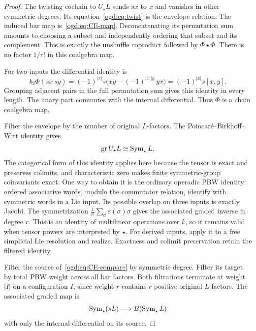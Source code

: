 \begin{proof}
The twisting cochain to \(U_\star L\) sends \(sx\) to \(x\) and vanishes in other symmetric degrees.
Its equation~\eqref{ogd:eq:twist} is the envelope relation.
The induced bar map is~\eqref{ogd:eq:CE-map}.
Deconcatenating its permutation sum amounts to choosing a subset and independently ordering that subset and its complement.
This is exactly the unshuffle coproduct followed by \(\Phi\star\Phi\).
There is no factor \(1/r!\) in this coalgebra map.

For two inputs the differential identity is
\[
 b_2\Phi(sx\,sy)=(-1)^{|x|}
 s\bigl(xy-(-1)^{|x||y|}yx\bigr)=(-1)^{|x|}s[x,y].
\]
Grouping adjacent pairs in the full permutation sum gives this identity in every length.
The unary part commutes with the internal differential.
Thus \(\Phi\) is a chain coalgebra map.

Filter the envelope by the number of original \(L\)-factors.
The Poincar\'e--Birkhoff--Witt identity gives
\begin{equation}\label{ogd:eq:PBW}
 \operatorname{gr}U_\star L\simeq\operatorname{Sym}_\star L.
\end{equation}
The categorical form of this identity applies here because the tensor is exact and preserves colimits, and characteristic zero makes finite symmetric-group coinvariants exact.
One way to obtain it is the ordinary operadic PBW identity: ordered associative words, modulo the commutator relation, identify with symmetric words in a Lie input.
Its possible overlap on three inputs is exactly Jacobi.
The symmetrization \(\frac1{r!}\sum_{\sigma}\varepsilon(\sigma)\sigma\) gives the associated graded inverse in degree \(r\).
This is an identity of multilinear operations over \(k\), so it remains valid when tensor powers are interpreted by \(\star\).
For derived inputs, apply it to a free simplicial Lie resolution and realize.
Exactness and colimit preservation retain the filtered identity.

Filter the source of~\eqref{ogd:eq:CE-compare} by symmetric degree.
Filter its target by total PBW weight across all bar factors.
Both filtrations terminate at weight \(|I|\) on a configuration \(I\), since weight \(r\) contains \(r\) positive original \(L\)-factors.
The associated graded map is
\begin{equation}\label{ogd:eq:abelian-Koszul}
 \operatorname{Sym}_\star(sL)\longrightarrow B(\operatorname{Sym}_\star L)
\end{equation}
with only the internal differential on its source.


\end{proof}
